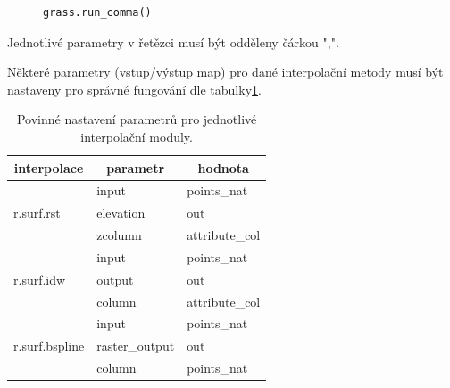 \documentclass[a4paper,12pt,oneside]{report}
\begin{document}
\begin{figure}[h!]
\begin{footnotesize}
\lstset{extendedchars=false,
escapeinside=''}
\begin{lstlisting}[style=mybash]
grass.run_comma()                                                           
\end{lstlisting}
\end{footnotesize}
\end{figure}
Jednotlivé parametry v řetězci musí být odděleny čárkou ",".

Některé parametry (vstup/výstup map) pro dané interpolační metody musí být nastaveny pro správné fungování dle tabulky\ref{tab:interpol}.

\begin{table}[h]
\centering
\begin{tabular}{|lll|}
\hline
\multicolumn{1}{|c}{interpolace} & \multicolumn{1}{c}{parametr} & \multicolumn{1}{c|}{hodnota} \\ \hline\hline
\multirow{3}{*}{r.surf.rst}      & input                        & points\_nat                  \\
                                 & elevation                    & out                          \\
                                 & zcolumn                      & attribute\_col               \\\hline
\multirow{3}{*}{r.surf.idw}      & input                        & points\_nat                  \\
                                 & output                       & out                          \\
                                 & column                       & attribute\_col               \\\hline
\multirow{3}{*}{r.surf.bspline}  & input                        & points\_nat                  \\
                                 & raster\_output               & out                          \\
                                 & column                       & points\_nat                  \\ \hline
\end{tabular}
\caption{Povinné nastavení parametrů pro jednotlivé interpolační moduly.}
\label{tab:interpol}
\end{table}
\end{document}
